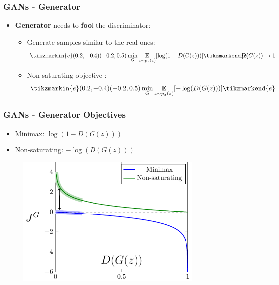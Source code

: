 \documentclass{beamer}
\begin{document}
{
	\begin{frame}[plain]
\end{frame}
}

\begin{frame}
	\frametitle{GANs - Generator}
	\begin{itemize}
		\item \textbf{Generator} needs to \textbf{fool} the discriminator:
		\begin{itemize}	
			\item<1-> \alert<+>{Generate samples similar to the real ones:
			\begin{equation}
				\tikzmarkin{c}(0.2,-0.4)(-0.2,0.5)
				\min_G \underset{z \sim p_z(z)}{\mathbb{E}}[\log(1 - D(G(z)))]
				\tikzmarkend{c}
				\hspace{-1.2cm}
				\tag*{$D(G(z)) \rightarrow 1$}
			\end{equation}}
				\item<2-> \alert<+>{Non saturating objective \citep{goodfellowGenerativeAdversarialNetworks2014}:
					\begin{equation*}
					\tikzmarkin{e}(0.2,-0.4)(-0.2,0.5)
					\min_G  \underset{z \sim p_z(z)}{\mathbb{E}}[ - \log( D(G(z)))]
					\tikzmarkend{e}
				\end{equation*}
				}
		\end{itemize}
	\end{itemize}
\end{frame}

\begin{frame}
\frametitle{GANs - Generator Objectives}
\begin{itemize}
	\item Minimax: $ \log(1 - D(G(z))) $
	\item Non-saturating: $ - \log(D(G(z)))$
\end{itemize}
	\begin{figure}
		\includegraphics[width=0.8\textwidth, keepaspectratio]{images/loss_function}
	\end{figure}
\end{frame}
\end{document}
